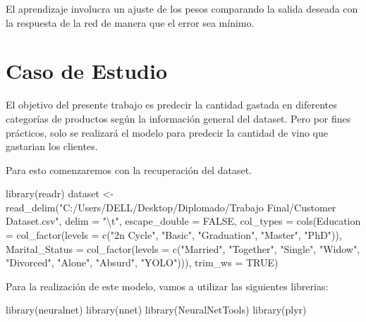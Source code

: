 \documentclass[Iberoamerican Journal of Industrial
Engineering,article,submit,moreauthors,pdftex]{Definitions/mdpi}
\newenvironment{Shaded}{\begin{snugshade}}{\end{snugshade}}
\newcommand{\AttributeTok}[1]{\textcolor[rgb]{0.77,0.63,0.00}{#1}}
\newcommand{\ConstantTok}[1]{\textcolor[rgb]{0.00,0.00,0.00}{#1}}
\newcommand{\FunctionTok}[1]{\textcolor[rgb]{0.00,0.00,0.00}{#1}}
\newcommand{\NormalTok}[1]{#1}
\newcommand{\OtherTok}[1]{\textcolor[rgb]{0.56,0.35,0.01}{#1}}
\newcommand{\SpecialCharTok}[1]{\textcolor[rgb]{0.00,0.00,0.00}{#1}}
\newcommand{\StringTok}[1]{\textcolor[rgb]{0.31,0.60,0.02}{#1}}
\begin{document}
El aprendizaje involucra un ajuste de los pesos comparando la salida
deseada con la respuesta de la red de manera que el error sea mínimo.

\hypertarget{caso-de-estudio}{%
\section{Caso de Estudio}\label{caso-de-estudio}}

El objetivo del presente trabajo es predecir la cantidad gastada en
diferentes categorías de productos según la información general del
dataset. Pero por fines prácticos, solo se realizará el modelo para
predecir la cantidad de vino que gastarian los clientes.

Para esto comenzaremos con la recuperación del dataset.

\begin{Shaded}
\begin{Highlighting}[]
\FunctionTok{library}\NormalTok{(readr)}
\NormalTok{dataset }\OtherTok{\textless{}{-}} \FunctionTok{read\_delim}\NormalTok{(}\StringTok{"C:/Users/DELL/Desktop/Diplomado/Trabajo Final/Customer Dataset.csv"}\NormalTok{, }
    \AttributeTok{delim =} \StringTok{"}\SpecialCharTok{\textbackslash{}t}\StringTok{"}\NormalTok{, }\AttributeTok{escape\_double =} \ConstantTok{FALSE}\NormalTok{, }
    \AttributeTok{col\_types =} \FunctionTok{cols}\NormalTok{(}\AttributeTok{Education =} \FunctionTok{col\_factor}\NormalTok{(}\AttributeTok{levels =} \FunctionTok{c}\NormalTok{(}\StringTok{"2n Cycle"}\NormalTok{, }
        \StringTok{"Basic"}\NormalTok{, }\StringTok{"Graduation"}\NormalTok{, }\StringTok{"Master"}\NormalTok{, }
        \StringTok{"PhD"}\NormalTok{)), }\AttributeTok{Marital\_Status =} \FunctionTok{col\_factor}\NormalTok{(}\AttributeTok{levels =} \FunctionTok{c}\NormalTok{(}\StringTok{"Married"}\NormalTok{, }
        \StringTok{"Together"}\NormalTok{, }\StringTok{"Single"}\NormalTok{, }\StringTok{"Widow"}\NormalTok{, }\StringTok{"Divorced"}\NormalTok{, }
        \StringTok{"Alone"}\NormalTok{, }\StringTok{"Absurd"}\NormalTok{, }\StringTok{"YOLO"}\NormalTok{))), }\AttributeTok{trim\_ws =} \ConstantTok{TRUE}\NormalTok{)}
\end{Highlighting}
\end{Shaded}

Para la realización de este modelo, vamos a utilizar las siguientes
librerias:

\begin{Shaded}
\begin{Highlighting}[]
\FunctionTok{library}\NormalTok{(neuralnet)}
\FunctionTok{library}\NormalTok{(nnet) }
\FunctionTok{library}\NormalTok{(NeuralNetTools)}
\FunctionTok{library}\NormalTok{(plyr)}
\end{Highlighting}
\end{Shaded}
\end{document}
